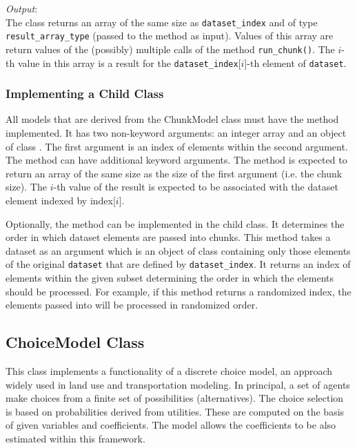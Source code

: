 {{\it Output}:~\\[1mm]
%
The class returns an array of the same size as \verb|dataset_index| and of type \verb|result_array_type| 
(passed to the method as input).
Values of this array are return values of the (possibly) multiple calls of the method \verb|run_chunk()|.
The $i$-th value in this array is a result for the \verb|dataset_index|[$i$]-th element of \verb|dataset|.

\subsubsection{Implementing a Child Class}
%
All models that are derived from the ChunkModel class must have the method  implemented. 
It has two non-keyword arguments: an integer array and an object of class . The first argument 
is an index of elements within the second argument. The method can have additional keyword arguments.  
The method is expected to return an array of the same size as the size of the first argument (i.e. the chunk size).
The $i$-th value of the result is expected to be associated with the dataset element indexed by index[$i$].

Optionally, the method   can be implemented in the child class. It determines the order in which 
dataset elements are passed into chunks. This method takes a dataset \datasetindex as an argument which is an
object of class  \datasetsubsetindex containing only those elements of the
original \verb|dataset| \datasetindex that are defined by \verb|dataset_index|. \datasetindex It returns
an index of elements within the given subset determining the order in which the
elements should be processed. For example, if this method returns a randomized
index, the elements passed into  will be processed in
randomized order.



\subsection{ChoiceModel Class}
\label{sec:choice-model}
%
This class implements a functionality of a discrete choice model, an approach
widely used in land use and transportation modeling. In principal, a set of
agents make choices from a finite set of possibilities (alternatives). The
choice selection is based on probabilities derived from utilities. These are
computed on the basis of given variables \variablesindex and coefficients. \coefficientsindex The model allows
the coefficients \coefficientsindex to be also estimated within this framework.

}
